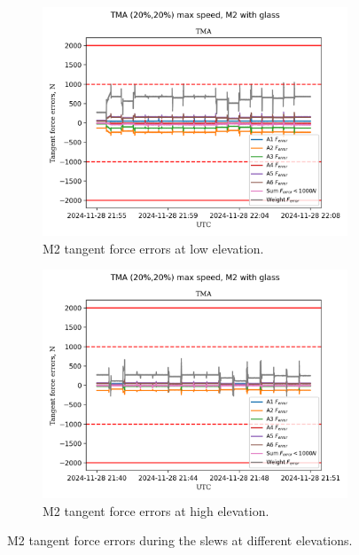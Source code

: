 \begin{figure}
    \centering
    \begin{subfigure}[b]{0.45\textwidth}
        \centering
        \includegraphics[width=\textwidth]{spa/20_vel_acc_jerk/BLOCK-T227_m2_tangent_force_errors.png}
        \caption{M2 tangent force errors at low elevation.}
        \label{fig:block227_m2_tangent_force_errors}
    \end{subfigure}
    \hfill
    \begin{subfigure}[b]{0.45\textwidth}
        \centering
        \includegraphics[width=\textwidth]{spa/20_vel_acc_jerk/BLOCK-T293_m2_tangent_force_errors.png}
        \caption{M2 tangent force errors at high elevation.}
        \label{fig:block293_m2_tangent_force_errors}
    \end{subfigure}
    \caption{M2 tangent force errors during the slews at different elevations.}
    \label{fig:m2_tangent_force_errors}
\end{figure}


